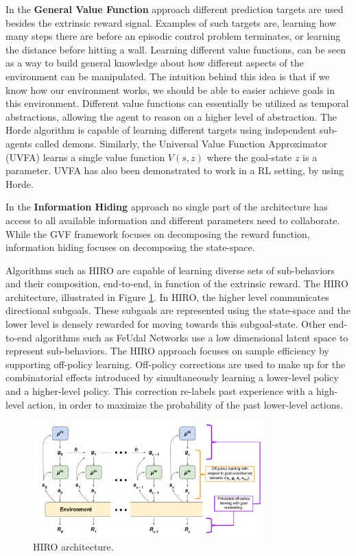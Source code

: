 In the \textbf{General Value Function} \cite{Horde} approach different prediction targets are used besides the extrinsic reward signal.
Examples of such targets are, learning how many steps there are
before an episodic control problem terminates, or learning the distance before hitting a wall.
Learning different value functions, can be seen as a way to build general knowledge about
how different aspects of the environment can be manipulated. The intuition behind this
idea is that if we know how our environment works, we should be able to easier achieve
goals in this environment. Different value functions can essentially be utilized as temporal
abstractions, allowing the agent to reason on a higher level of abstraction.
The Horde algorithm \cite{Horde} is capable of learning different targets using independent sub-agents called demons.
Similarly, the Universal Value Function Approximator (UVFA) learns a single value function $V(s, z)$ where the goal-state $z$ is a parameter.
UVFA has also been demonstrated to work in a RL setting, by using Horde.

In the \textbf{Information Hiding} \cite{Feudal_rl} approach no single part of the architecture has access to all available information and different parameters
need to collaborate. While the GVF framework focuses on decomposing the reward function, information hiding focuses on decomposing the state-space.


Algorithms such as HIRO \cite{HIRO} are capable of learning diverse sets of sub-behaviors and their composition, end-to-end, in function
of the extrinsic reward. The HIRO architecture, illustrated in Figure \ref{fig:HIRO}.
In HIRO, the higher level communicates directional subgoals. These subgoals are represented using the state-space and the
lower level is densely rewarded for moving towards this subgoal-state. Other end-to-end algorithms such as FeUdal Networks \cite{FuN}
use a low dimensional latent space to represent sub-behaviors.
The HIRO approach focuses on sample efficiency by supporting off-policy learning. Off-policy corrections are used to
make up for the combinatorial effects introduced by simultaneously learning a lower-level policy and a higher-level policy.
This correction re-labels past experience with a high-level action, in order to maximize the probability of the past lower-level actions.

\begin{figure}
    \centering
    \includegraphics[width=0.8\textwidth]{Images/HIRO.png}
    \caption{HIRO architecture.}
    \label{fig:HIRO}
\end{figure}


